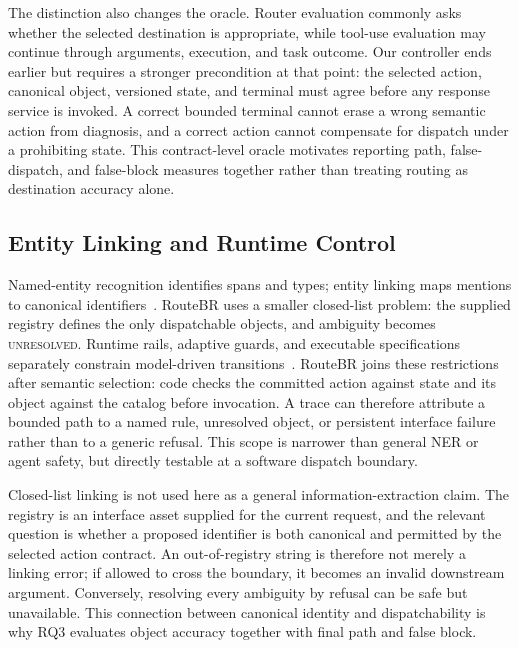 \documentclass[10pt,conference,a4paper]{IEEEtran}
\newcommand{\method}{RouteBR}
\begin{document}
The distinction also changes the oracle. Router evaluation commonly asks whether the selected destination is appropriate, while tool-use evaluation may continue through arguments, execution, and task outcome. Our controller ends earlier but requires a stronger precondition at that point: the selected action, canonical object, versioned state, and terminal must agree before any response service is invoked. A correct bounded terminal cannot erase a wrong semantic action from diagnosis, and a correct action cannot compensate for dispatch under a prohibiting state. This contract-level oracle motivates reporting path, false-dispatch, and false-block measures together rather than treating routing as destination accuracy alone.

\subsection{Entity Linking and Runtime Control}

Named-entity recognition identifies spans and types; entity linking maps mentions to canonical identifiers~\cite{tedeschi2022multinerd,wu2020scalable,de2020autoregressive,de2022multilingual,botha2020entity}. \method{} uses a smaller closed-list problem: the supplied registry defines the only dispatchable objects, and ambiguity becomes \textsc{unresolved}. Runtime rails, adaptive guards, and executable specifications separately constrain model-driven transitions~\cite{rebedea2023nemo,yang2025adaptiveguard,wang2025agentspec}. \method{} joins these restrictions after semantic selection: code checks the committed action against state and its object against the catalog before invocation. A trace can therefore attribute a bounded path to a named rule, unresolved object, or persistent interface failure rather than to a generic refusal. This scope is narrower than general NER or agent safety, but directly testable at a software dispatch boundary.

Closed-list linking is not used here as a general information-extraction claim. The registry is an interface asset supplied for the current request, and the relevant question is whether a proposed identifier is both canonical and permitted by the selected action contract. An out-of-registry string is therefore not merely a linking error; if allowed to cross the boundary, it becomes an invalid downstream argument. Conversely, resolving every ambiguity by refusal can be safe but unavailable. This connection between canonical identity and dispatchability is why RQ3 evaluates object accuracy together with final path and false block.
\end{document}
